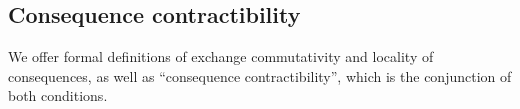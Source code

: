 




\subsection{Consequence contractibility}

We offer formal definitions of exchange commutativity and locality of consequences, as well as ``consequence contractibility'', which is the conjunction of both conditions.


